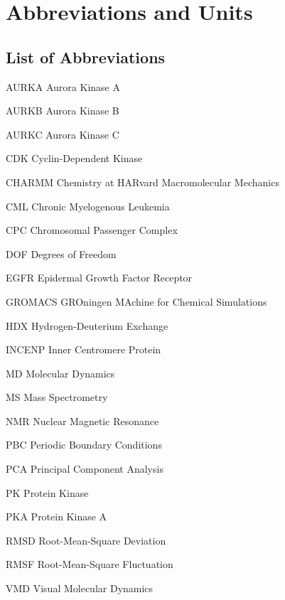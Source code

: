 \chapter{Abbreviations and Units}\label{sec:Appendix B}

\section{List of Abbreviations}

\begin{abbreviations}
    \item[AURKA] Aurora Kinase A
    \item[AURKB] Aurora Kinase B
    \item[AURKC] Aurora Kinase C
    \item[CDK] Cyclin-Dependent Kinase
    \item[CHARMM] Chemistry at HARvard Macromolecular Mechanics
    \item[CML] Chronic Myelogenous Leukemia 
    \item[CPC] Chromosomal Passenger Complex
    \item[DOF] Degrees of Freedom
    \item[EGFR] Epidermal Growth Factor Receptor
    \item[GROMACS] GROningen MAchine for Chemical Simulations
    \item[HDX] Hydrogen-Deuterium Exchange
    \item[INCENP] Inner Centromere Protein
    \item[MD] Molecular Dynamics
    \item[MS] Mass Spectrometry
    \item[NMR] Nuclear Magnetic Resonance
    \item[PBC] Periodic Boundary Conditions
    \item[PCA] Principal Component Analysis
    \item[PK] Protein Kinase
    \item[PKA] Protein Kinase A
    \item[RMSD] Root-Mean-Square Deviation
    \item[RMSF] Root-Mean-Square Fluctuation
    \item[VMD] Visual Molecular Dynamics
\end{abbreviations}

